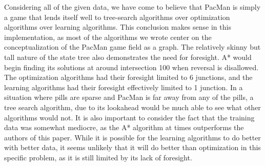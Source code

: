 \documentclass[a4paper]{article}
\begin{document}
Considering all of the given data, we have come to believe that PacMan is simply a game that lends itself well to tree-search algorithms over optimization algorithms over learning algorithms.  This conclusion makes sense in this implementation, as most of the algorithms we wrote center on the conceptualization of the PacMan game field as a graph.  The relatively skinny but tall nature of the state tree also demonstrates the need for foresight.  A* would begin finding its solutions at around intersection 100 when reversal is disallowed.  The optimization algorithms had their foresight limited to 6 junctions, and the learning algorithms had their foresight effectively limited to 1 junction.  In a situation where pills are sparse and PacMan is far away from any of the pills, a tree search algorithm, due to its lookahead would be much able to see what other algorithms would not.  It is also important to consider the fact that the training data was somewhat mediocre, as the A* algorithm at times outperforms the authors of this paper.  While it is possible for the learning algorithms to do better with better data, it seems unlikely that it will do better than optimization in this specific problem, as it is still limited by its lack of foresight.  
\end{document}
